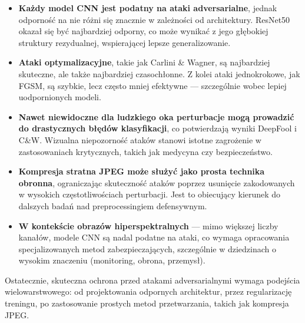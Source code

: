 \documentclass[12pt]{article}
\begin{document}
\begin{itemize}
    \item \textbf{Każdy model CNN jest podatny na ataki adversarialne}, jednak odporność na nie różni się znacznie w zależności od architektury. ResNet50 okazał się być najbardziej odporny, co może wynikać z jego głębokiej struktury rezydualnej, wspierającej lepsze generalizowanie.

    \item \textbf{Ataki optymalizacyjne}, takie jak Carlini \& Wagner, są najbardziej skuteczne, ale także najbardziej czasochłonne. Z kolei ataki jednokrokowe, jak FGSM, są szybkie, lecz często mniej efektywne — szczególnie wobec lepiej uodpornionych modeli.

    \item \textbf{Nawet niewidoczne dla ludzkiego oka perturbacje mogą prowadzić do drastycznych błędów klasyfikacji}, co potwierdzają wyniki DeepFool i C\&W. Wizualna niepozorność ataków stanowi istotne zagrożenie w zastosowaniach krytycznych, takich jak medycyna czy bezpieczeństwo.

    \item \textbf{Kompresja stratna JPEG może służyć jako prosta technika obronna}, ograniczając skuteczność ataków poprzez usunięcie zakodowanych w wysokich częstotliwościach perturbacji. Jest to obiecujący kierunek do dalszych badań nad preprocessingiem defensywnym.

    \item \textbf{W kontekście obrazów hiperspektralnych} — mimo większej liczby kanałów, modele CNN są nadal podatne na ataki, co wymaga opracowania specjalizowanych metod zabezpieczających, szczególnie w dziedzinach o wysokim znaczeniu (monitoring, obrona, przemysł).
\end{itemize}

Ostatecznie, skuteczna ochrona przed atakami adversarialnymi wymaga podejścia wielowarstwowego: od projektowania odpornych architektur, przez regularizację treningu, po zastosowanie prostych metod przetwarzania, takich jak kompresja JPEG.

\printbibliography
\end{document}
